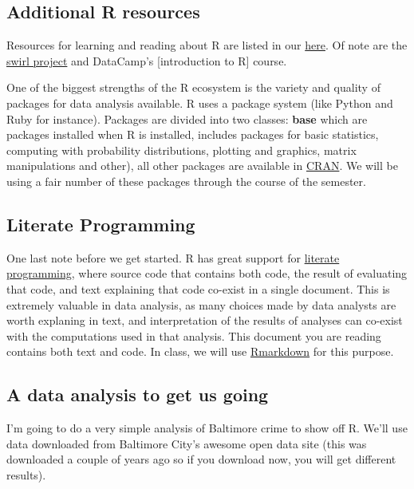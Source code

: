 \documentclass[]{article}
\theoremstyle{definition}
\theoremstyle{definition}
\theoremstyle{remark}
\begin{document}
\subsection{Additional R resources}\label{additional-r-resources}

Resources for learning and reading about R are listed in our
\href{http://www.hcbravo.org/IntroDataScience/resources/}{here}. Of note
are the \href{http://swirlstats.com/}{swirl project} and DataCamp's
{[}introduction to R{]} course.

One of the biggest strengths of the R ecosystem is the variety and
quality of packages for data analysis available. R uses a package system
(like Python and Ruby for instance). Packages are divided into two
classes: \textbf{base} which are packages installed when R is installed,
includes packages for basic statistics, computing with probability
distributions, plotting and graphics, matrix manipulations and other),
all other packages are available in
\href{http://cran.r-project.org}{CRAN}. We will be using a fair number
of these packages through the course of the semester.

\subsection{Literate Programming}\label{literate-programming}

One last note before we get started. R has great support for
\href{http://en.wikipedia.org/wiki/Literate_programming}{literate
programming}, where source code that contains both code, the result of
evaluating that code, and text explaining that code co-exist in a single
document. This is extremely valuable in data analysis, as many choices
made by data analysts are worth explaning in text, and interpretation of
the results of analyses can co-exist with the computations used in that
analysis. This document you are reading contains both text and code. In
class, we will use \href{http://rmarkdown.rstudio.com/}{Rmarkdown} for
this purpose.

\subsection{A data analysis to get us
going}\label{a-data-analysis-to-get-us-going}

I'm going to do a very simple analysis of Baltimore crime to show off R.
We'll use data downloaded from Baltimore City's awesome open data site
(this was downloaded a couple of years ago so if you download now, you
will get different results).
\end{document}
